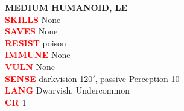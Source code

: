 \documentclass{article}
\begin{document}
\begin{adjustbox}{minipage=0.45\textwidth, margin=\fboxsep, bgimage=../images/texture2.pdf}
{\begin{minipage}[t][10.5in][t]{0.9\textwidth}
        \begin{flushleft}
            {\large\textbf{MEDIUM HUMANOID, LE}}\\
            \textcolor{red}{\textbf{SKILLS}} None \\
            \textcolor{red}{\textbf{SAVES}} None \\
            \textcolor{red}{\textbf{RESIST}} poison\\
            \textcolor{red}{\textbf{IMMUNE}} None\\
            \textcolor{red}{\textbf{VULN}} None\\      
            \textcolor{red}{\textbf{SENSE}} darkvision 120$'$, passive Perception 10\\
            \textcolor{red}{\textbf{LANG}} Dwarvish, Undercommon\\
            \textcolor{red}{\textbf{CR}}  1\\
        \end{flushleft}
        \end{minipage}
    }
\end{adjustbox}                     
    



\pagebreak
\end{document}
